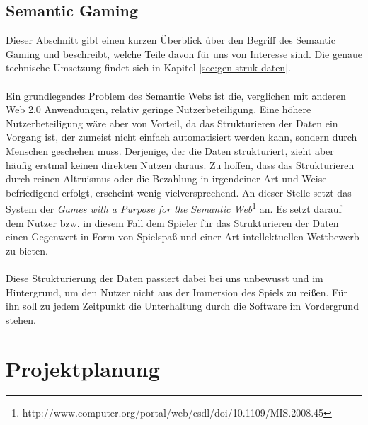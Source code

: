 \documentclass[a4paper, 11pt]{article}
\begin{document}
\subsection{Semantic Gaming}
Dieser Abschnitt gibt einen kurzen Überblick über den Begriff des Semantic Gaming und beschreibt, welche Teile davon für uns von Interesse sind. Die genaue technische Umsetzung findet sich in Kapitel \ref{sec:gen-struk-daten}.\\\\
Ein grundlegendes Problem des Semantic Webs ist die, verglichen mit anderen Web 2.0 Anwendungen, relativ geringe Nutzerbeteiligung. Eine höhere Nutzerbeteiligung wäre aber von Vorteil, da das Strukturieren der Daten ein Vorgang ist, der zumeist nicht einfach automatisiert werden kann, sondern durch Menschen geschehen muss. Derjenige, der die Daten strukturiert, zieht aber häufig erstmal keinen direkten Nutzen daraus. Zu hoffen, dass das Strukturieren durch reinen Altruismus oder die Bezahlung in irgendeiner Art und Weise befriedigend erfolgt, erscheint wenig vielversprechend. An dieser Stelle setzt das System der \textit{Games with a Purpose for the Semantic Web}\footnote{http://www.computer.org/portal/web/csdl/doi/10.1109/MIS.2008.45} an. Es setzt darauf dem Nutzer bzw. in diesem Fall dem Spieler für das Strukturieren der Daten einen Gegenwert in Form von Spielspaß und einer Art intellektuellen Wettbewerb zu bieten.\\\\
Diese Strukturierung der Daten passiert dabei bei uns unbewusst und im Hintergrund, um den Nutzer nicht aus der Immersion des Spiels zu reißen. Für ihn soll zu jedem Zeitpunkt die Unterhaltung durch die Software im Vordergrund stehen. 
\newpage
\section{Projektplanung}
\end{document}
